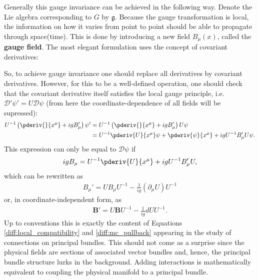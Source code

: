     Generally this gauge invariance can be achieved in the following way. Denote the Lie algebra corresponding to $G$ by $\mathfrak{g}$. Because the gauge transformation is local, the information on how it varies from point to point should be able to propagate through space(time). This is done by introducing a new field $B_\mu(x)$, called the \textbf{gauge field}. The most elegant formulation uses the concept of covariant derivatives:

    So, to achieve gauge invariance one should replace all derivatives by covariant derivatives. However, for this to be a well-defined operation, one should check that the covariant derivative itself satisfies the local gauge principle, i.e. $\mathcal{D}'\psi' = U\mathcal{D}\psi$ (from here the coordinate-dependence of all fields will be supressed):
    \begin{align}
        U^{-1}\left(\pderiv{}{x^\mu} + igB_\mu'\right)\psi' &= U^{-1}\left(\pderiv{}{x^\mu} + igB_\mu'\right)U\psi\nonumber\\
        &= U^{-1}\pderiv{U}{x^\mu}\psi + \pderiv{\psi}{x^\mu} + igU^{-1}B_\mu'U\psi.
    \end{align}
    This expression can only be equal to $\mathcal{D}\psi$ if
    \begin{gather}
        igB_\mu = U^{-1}\pderiv{U}{x^\mu} + igU^{-1}B_\mu'U,
    \end{gather}
    which can be rewritten as
    \begin{gather}
        B_\mu' = UB_\mu U^{-1} - \frac{1}{ig}(\partial_\mu U)U^{-1}
    \end{gather}
    or, in coordinate-independent form, as
    \begin{gather}
        \mathbf{B}' = U\mathbf{B}U^{-1} - \frac{1}{ig}dUU^{-1}.
    \end{gather}
    Up to conventions this is exactly the content of Equations \eqref{diff:local_compatibility} and \eqref{diff:mc_pullback} appearing in the study of connections on principal bundles. This should not come as a surprise since the physical fields are sections of associated vector bundles and, hence, the principal bundle structure lurks in the background. Adding interactions is mathematically equivalent to coupling the physical manifold to a principal bundle.

